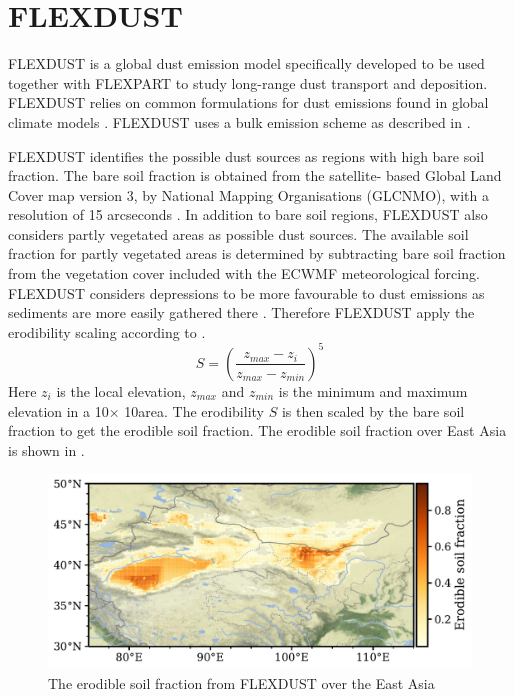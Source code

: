 \section{FLEXDUST}\label{sec:flexdust}
FLEXDUST is a global dust emission model specifically developed to be used together 
with FLEXPART to study long-range dust transport and deposition. FLEXDUST relies on common 
formulations for dust emissions found in global climate models \parencite{flexdust_ref_2016}. FLEXDUST uses a bulk emission scheme as described in . 

FLEXDUST identifies the possible dust sources as regions with high bare soil 
fraction. The bare soil fraction is obtained from the satellite- 
based Global Land Cover map version 3, by National Mapping Organisations (GLCNMO), with a 
resolution of 15 arcseconds \parencite{shirahata2017production}.
In addition to bare soil regions, FLEXDUST also considers partly vegetated areas as possible
dust sources. The available soil fraction for partly vegetated areas is determined by
subtracting bare soil fraction from the vegetation cover included with the ECWMF meteorological forcing.
FLEXDUST considers depressions to be more favourable to dust emissions as sediments are more easily gathered there \parencite{zender2003mineral}. Therefore FLEXDUST apply the erodibility scaling 
 according to \textcite{dust_dist_Ginoux2001}. 
\begin{equation}\label{eq_ero_soil_frac}
    S = \left(\frac{z_{max} - z_i}{z_{max} - z_{min}}\right)^5 
\end{equation}    
Here $z_i$ is the local elevation, $z_{max}$ and $z_{min}$ is the minimum and
maximum elevation in a 10\degree $\times$ 10\degree area.  The erodibility $S$ is
then scaled by the bare soil fraction to get the erodible soil fraction. The erodible soil fraction over East Asia is shown in . 
\begin{figure}[hptb]
    \centering
    \includegraphics[width=\textwidth]{../figs/erodible_soil_fraction.pdf}
    \caption{The erodible soil fraction from FLEXDUST over the East Asia}
    \label{fig:erodible_soil_fraction_EA}
\end{figure}

